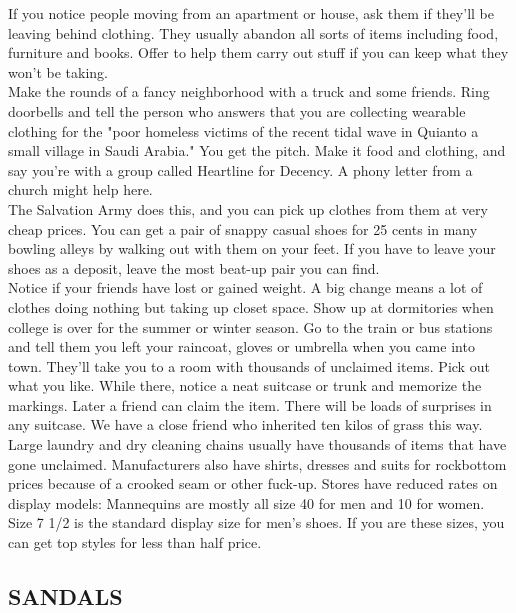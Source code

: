\documentclass[11pt,twoside,a4paper]{book}
\begin{document}
If you notice people moving from an apartment or house, ask them if they'll be leaving behind clothing. They usually abandon all sorts of items including food, furniture and books. Offer to help them carry out stuff if you can keep what they won't be taking.~\\

Make the rounds of a fancy neighborhood with a truck and some friends. Ring doorbells and tell the person who answers that you are collecting wearable clothing for the "poor homeless victims of the recent tidal wave in Quianto a small village in Saudi Arabia." You get the pitch. Make it food and clothing, and say you're with a group called Heartline for Decency. A phony letter from a church might help here.~\\

The Salvation Army does this, and you can pick up clothes from them at very cheap prices. You can get a pair of snappy casual shoes for 25 cents in many bowling alleys by walking out with them on your feet. If you have to leave your shoes as a deposit, leave the most beat-up pair you can find.~\\

Notice if your friends have lost or gained weight. A big change means a lot of clothes doing nothing but taking up closet space. Show up at dormitories when college is over for the summer or winter season. Go to the train or bus stations and tell them you left your raincoat, gloves or umbrella when you came into town. They'll take you to a room with thousands of unclaimed items. Pick out what you like. While there, notice a neat suitcase or trunk and memorize the markings. Later a friend can claim the item. There will be loads of surprises in any suitcase. We have a close friend who inherited ten kilos of grass this way.~\\

Large laundry and dry cleaning chains usually have thousands of items that have gone unclaimed. Manufacturers also have shirts, dresses and suits for rockbottom prices because of a crooked seam or other fuck-up. Stores have reduced rates on display models: Mannequins are mostly all size 40 for men and 10 for women. Size 7 1/2 is the standard display size for men's shoes. If you are these sizes, you can get top styles for less than half price.

\subsection{SANDALS}
\end{document}
